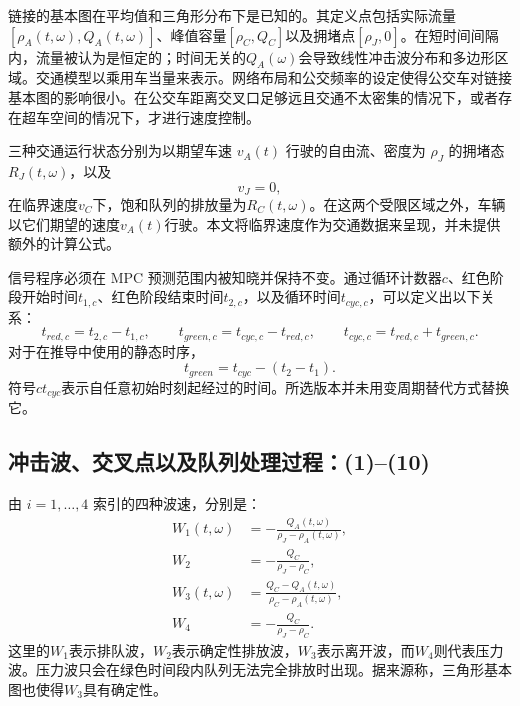 \documentclass{article}
\begin{document}
链接的基本图在平均值和三角形分布下是已知的。其定义点包括实际流量\([\rho_A(t,\omega),Q_A(t,\omega)]\)、峰值容量\([\rho_C,Q_C]\)以及拥堵点\([\rho_J,0]\)。在短时间间隔内，流量被认为是恒定的；时间无关的\(Q_A(\omega)\)会导致线性冲击波分布和多边形区域。交通模型以乘用车当量来表示。网络布局和公交频率的设定使得公交车对链接基本图的影响很小。在公交车距离交叉口足够远且交通不太密集的情况下，或者存在超车空间的情况下，才进行速度控制。

三种交通运行状态分别为以期望车速 \(v_A(t)\) 行驶的自由流、密度为 \(\rho_J\) 的拥堵态 \(R_J(t,\omega)\)，以及
\[
v_J=0,
\]
在临界速度\(v_C\)下，饱和队列的排放量为\(R_C(t,\omega)\)。在这两个受限区域之外，车辆以它们期望的速度\(v_A(t)\)行驶。本文将临界速度作为交通数据来呈现，并未提供额外的计算公式。

信号程序必须在 MPC 预测范围内被知晓并保持不变。通过循环计数器\(c\)、红色阶段开始时间\(t_{1,c}\)、红色阶段结束时间\(t_{2,c}\)，以及循环时间\(t_{cyc,c}\)，可以定义出以下关系：
\[
t_{red,c}=t_{2,c}-t_{1,c},\qquad
t_{green,c}=t_{cyc,c}-t_{red,c},\qquad
t_{cyc,c}=t_{red,c}+t_{green,c}.
\]
对于在推导中使用的静态时序，
\[
t_{green}=t_{cyc}-(t_2-t_1).
\]
符号\(ct_{cyc}\)表示自任意初始时刻起经过的时间。所选版本并未用变周期替代方式替换它。

\subsection*{冲击波、交叉点以及队列处理过程：(1)–(10)}
由 \(i=1,\ldots,4\) 索引的四种波速，分别是：
\begin{align}
W_1(t,\omega)&=-\frac{Q_A(t,\omega)}{\rho_J-\rho_A(t,\omega)}, \tag{1}\\
W_2&=-\frac{Q_C}{\rho_J-\rho_C}, \tag{2}\\
W_3(t,\omega)&=\frac{Q_C-Q_A(t,\omega)}{\rho_C-\rho_A(t,\omega)}, \tag{3}\\
W_4&=-\frac{Q_C}{\rho_J-\rho_C}. \tag{4}
\end{align}
这里的\(W_1\)表示排队波，\(W_2\)表示确定性排放波，\(W_3\)表示离开波，而\(W_4\)则代表压力波。压力波只会在绿色时间段内队列无法完全排放时出现。据来源称，三角形基本图也使得\(W_3\)具有确定性。
\end{document}
